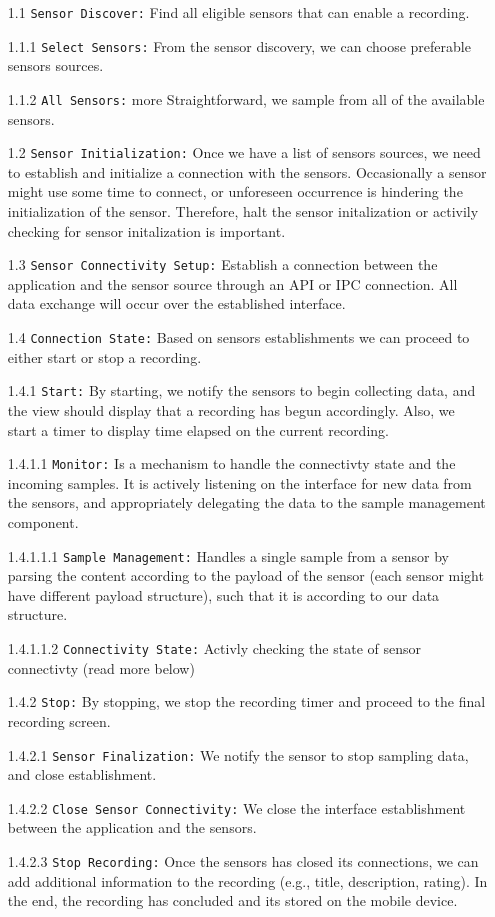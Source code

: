\begin{itemize}
    \item[1.1] \verb|Sensor Discover:| Find all eligible sensors that can enable a recording.
    \item[1.1.1] \verb|Select Sensors:| From the sensor discovery, we can choose preferable sensors sources.
    \item[1.1.2] \verb|All Sensors:| more Straightforward, we sample from all of the available sensors.
    \item[1.2] \verb|Sensor Initialization:| Once we have a list of sensors sources, we need to establish and initialize a connection with the sensors. Occasionally a sensor might use some time to connect, or unforeseen occurrence is hindering the initialization of the sensor. Therefore, halt the sensor initalization or activily checking for sensor initalization is important. 
    \item[1.3] \verb|Sensor Connectivity Setup:| Establish a connection between the application and the sensor source through an API or IPC connection. All data exchange will occur over the established interface. 
    \item[1.4] \verb|Connection State:| Based on sensors establishments we can proceed to either start or stop a recording. 
    \item[1.4.1] \verb|Start:| By starting, we notify the sensors to begin collecting data, and the view should display that a recording has begun accordingly. Also, we start a timer to display time elapsed on the current recording. 
    \item[1.4.1.1] \verb|Monitor:| Is a mechanism to handle the connectivty state and the incoming samples. It is actively listening on the interface for new data from the sensors, and appropriately delegating the data to the sample management component.  
    \item[1.4.1.1.1] \verb|Sample Management:| Handles a single sample from a sensor by parsing the content according to the payload of the sensor (each sensor might have different payload structure), such that it is according to our data structure.
    \item[1.4.1.1.2] \verb|Connectivity State:| Activly checking the state of sensor connectivty (read more below)
    \item[1.4.2] \verb|Stop:| By stopping, we stop the recording timer and proceed to the final recording screen.
    \item[1.4.2.1] \verb|Sensor Finalization:| We notify the sensor to stop sampling data, and close establishment.
    \item[1.4.2.2] \verb|Close Sensor Connectivity:| We close the interface establishment between the application and the sensors. 
    \item[1.4.2.3] \verb|Stop Recording:| Once the sensors has closed its connections, we can add additional information to the recording (e.g., title, description, rating). In the end, the recording has concluded and its stored on the mobile device.
\end{itemize}


